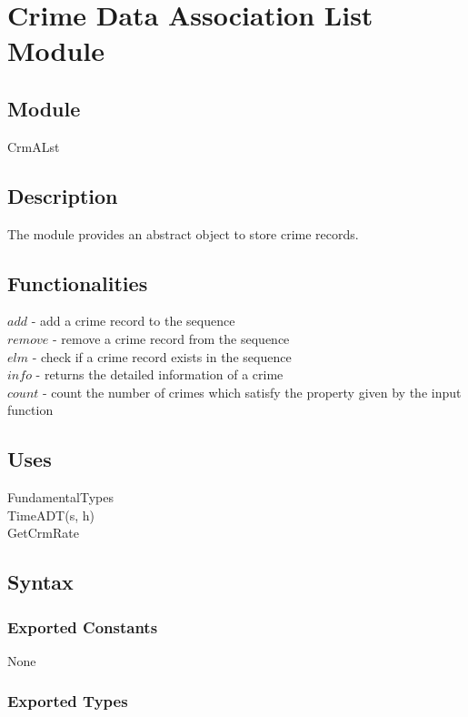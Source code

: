 \documentclass[12pt]{article}
\begin{document}
\newpage

\section* {Crime Data Association List Module}

\subsection*{Module}

CrmALst

\subsection*{Description}
The module provides an abstract object to store crime records.

\subsection*{Functionalities}
$add$ - add a crime record to the sequence\\
$remove$ - remove a crime record from the sequence\\
$elm$ - check if a crime record exists in the sequence\\
$info$ - returns the detailed information of a crime\\
$count$ - count the number of crimes which satisfy the property given by the input function

\subsection* {Uses} 

FundamentalTypes\\
TimeADT(s, h)\\
GetCrmRate

\subsection* {Syntax}

\subsubsection* {Exported Constants}

None

\subsubsection* {Exported Types}
\end{document}

